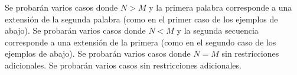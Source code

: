 \documentclass{oci}
\begin{document}
\begin{scoreDescription}
   Se probarán varios casos donde $N > M$ y la primera palabra 
  corresponde a una extensión de la segunda palabra (como en el primer caso de los ejemplos de abajo).
   Se probarán varios casos donde $N < M$ y la segunda secuencia 
  corresponde a una extensión de la primera (como en el segundo caso de los ejemplos de abajo).
   Se probarán varios casos donde $N=M$ sin restricciones adicionales.
   Se probarán varios casos sin restricciones adicionales.
\end{scoreDescription}

\begin{sampleDescription}
\end{sampleDescription}
\end{document}

